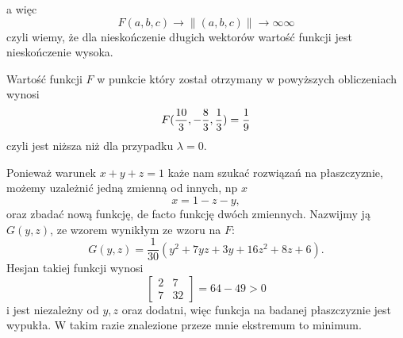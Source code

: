 \documentclass{article}[13pt]
\begin{document}
    a więc
    $$F(a,b,c)\xrightarrow{}{\|(a,b,c)\|\to\infty}\infty$$
    czyli wiemy, że dla nieskończenie długich wektorów wartość funkcji jest nieskończenie wysoka.
    \medskip

    Wartość funkcji $F$ w punkcie który został otrzymany w powyższych obliczeniach wynosi
    $$F({10\over3},-\frac83,\frac13)=\frac19$$
    czyli jest niższa niż dla przypadku $\lambda=0$.
    \medskip
    

    Ponieważ warunek $x+y+z=1$ każe nam szukać rozwiązań na płaszczyznie, możemy uzależnić jedną zmienną od innych, np $x$ 
    $$x=1-z-y,$$
    oraz zbadać nową funkcję, de facto funkcję dwóch zmiennych. Nazwijmy ją $G(y,z)$, ze wzorem wynikłym ze wzoru na $F$:
    $$G(y,z)=\frac1{30}(y^2+7yz+3y+16z^2+8z+6).$$
    Hesjan takiej funkcji wynosi
    $$
        \begin{bmatrix}
            2 & 7\\
            7 & 32
        \end{bmatrix}=64-49>0
    $$
    i jest niezależny od $y,z$ oraz dodatni, więc funkcja na badanej płaszczyznie jest wypukła. W takim razie znalezione przeze mnie ekstremum to minimum.
\end{document}
